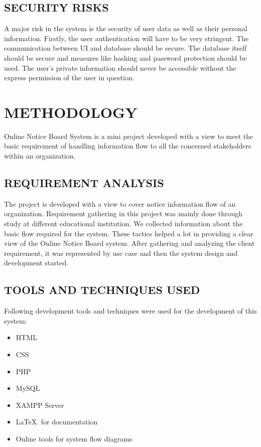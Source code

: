 \documentclass[12pt,a4paper]{article}
\begin{document}
    \subsection{SECURITY RISKS}
    A major risk in the system is the security of user data as well as their personal information. Firstly, the user authentication will have to be very stringent. The communication between UI and database should be secure. The database itself should be secure and measures like hashing and password protection should be used. The user’s private information should never be accessible without the express permission of the user in question.

\newpage
\section{METHODOLOGY}
Online Notice Board System is a mini project developed with a view to meet the basic requirement of handling information flow to all the concerned stakeholders within an organization.\\

    \subsection{REQUIREMENT ANALYSIS}
    The project is developed with a view to cover notice information flow of an organization. Requirement gathering in this project was mainly done through study at different educational institution. We collected information about the basic flow required for the system. These tactics helped a lot in providing a clear view of the Online Notice Board system. After gathering and analyzing the client requirement, it was represented by use case and then the system design and development started.\\
    
    \subsection{TOOLS AND TECHNIQUES USED}
    Following development tools and techniques were used for the development of this system:
    \begin{itemize}
        \item HTML
        \item CSS
        \item PHP
        \item MySQL
        \item XAMPP Server
        \item \LaTeX. for documentation
        \item Online tools for system flow diagrams\\
    \end{itemize}
    
\end{document}
